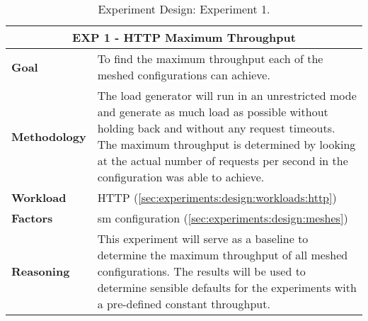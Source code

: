 \begin{table}[!t]
    \centering

    \begin{tabularx}{\textwidth}{l X}
    
        \toprule
        \multicolumn{2}{c}{\textbf{EXP 1 - HTTP Maximum Throughput}}  \\
        \toprule
        
        \textbf{Goal}
        & To find the maximum throughput each of the meshed configurations can achieve. \\
        \midrule
        
        \textbf{Methodology}
        & The load generator will run in an unrestricted mode and generate as much load as possible without holding back and without any request timeouts. The maximum throughput is determined by looking at the actual number of requests per second in the configuration was able to achieve. \\
        \midrule
        
        \textbf{Workload} 
        & HTTP (\cref{sec:experiments:design:workloads:http}) \\
        \midrule

        \multirow{1}{*}{\textbf{Factors}} 
        & \Gls{sm} configuration (\cref{sec:experiments:design:meshes}) \\
        \midrule
        
        \textbf{Reasoning}
        & This experiment will serve as a baseline to determine the maximum throughput of all meshed configurations. The results will be used to determine sensible defaults for the experiments with a pre-defined constant throughput. \\

        \bottomrule

    \end{tabularx}
    \caption[Experiment Design: Experiment 1.]{Experiment Design: Experiment 1.}
    \label{tab:experiment:design:01}
\end{table}